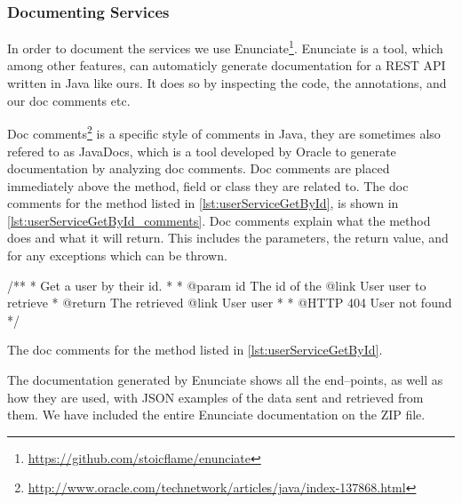 \subsubsection*{Documenting Services}
In order to document the services we use Enunciate\footnote{\url{https://github.com/stoicflame/enunciate}}.
Enunciate is a tool, which among other features, can automaticly generate documentation for a REST API written in Java like ours.
It does so by inspecting the code, the annotations, and our doc comments etc.

Doc comments\footnote{\url{http://www.oracle.com/technetwork/articles/java/index-137868.html}} is a specific style of comments in Java, they are sometimes also refered to as JavaDocs, which is a tool developed by Oracle to generate documentation by analyzing doc comments.
Doc comments are placed immediately above the method, field or class they are related to.
The doc comments for the method listed in \cref{lst:userServiceGetById}, is shown in \cref{lst:userServiceGetById_comments}.
Doc comments explain what the method does and what it will return.
This includes the parameters, the return value, and for any exceptions which can be thrown.

\begin{listing}
    \begin{java2}
/**
 * Get a user by their id.
 *
 * @param id The id of the {@link User user} to retrieve
 * @return The retrieved {@link User user}
 *
 * @HTTP 404 User not found
 */
    \end{java2}
    \caption{The doc comments for the method listed in \cref{lst:userServiceGetById}.}\label{lst:userServiceGetById_comments}
\end{listing}

The documentation generated by Enunciate shows all the end--points, as well as how they are used,
with JSON examples of the data sent and retrieved from them.
We have included the entire Enunciate documentation on the ZIP file.

